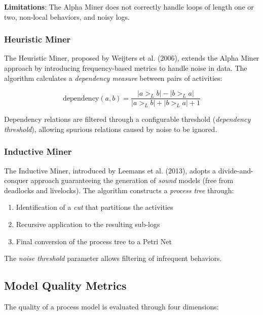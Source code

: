 \documentclass[a4paper,twoside,12pt]{article}
\begin{document}
\textbf{Limitations}: The Alpha Miner does not correctly handle loops of length one or two, non-local behaviors, and noisy logs.

\subsubsection{Heuristic Miner}

The Heuristic Miner, proposed by Weijters et al. (2006), extends the Alpha Miner approach by introducing frequency-based metrics to handle noise in data. The algorithm calculates a \textit{dependency measure} between pairs of activities:

\begin{equation}
    \text{dependency}(a, b) = \frac{|a >_L b| - |b >_L a|}{|a >_L b| + |b >_L a| + 1}
\end{equation}

Dependency relations are filtered through a configurable threshold (\textit{dependency threshold}), allowing spurious relations caused by noise to be ignored.

\subsubsection{Inductive Miner}

The Inductive Miner, introduced by Leemans et al. (2013), adopts a divide-and-conquer approach guaranteeing the generation of \textit{sound} models (free from deadlocks and livelocks). The algorithm constructs a \textit{process tree} through:

\begin{enumerate}
    \item Identification of a \textit{cut} that partitions the activities
    \item Recursive application to the resulting sub-logs
    \item Final conversion of the process tree to a Petri Net
\end{enumerate}

The \textit{noise threshold} parameter allows filtering of infrequent behaviors.

\subsection{Model Quality Metrics}

The quality of a process model is evaluated through four dimensions:
\end{document}
